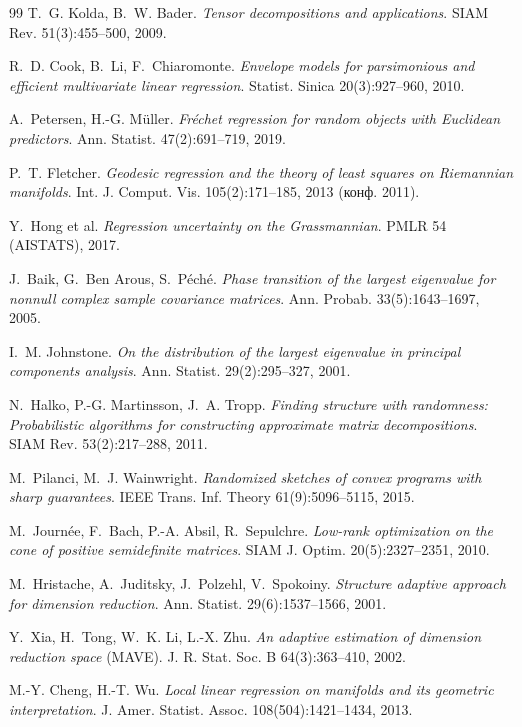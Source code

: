 \documentclass[11pt,a4paper]{article}
\theoremstyle{plain}
\theoremstyle{definition}
\theoremstyle{remark}
\begin{document}
\begin{thebibliography}{99}
T.~G. Kolda, B.~W. Bader.
\emph{Tensor decompositions and applications}.
SIAM Rev. 51(3):455--500, 2009.

R.~D. Cook, B.~Li, F.~Chiaromonte.
\emph{Envelope models for parsimonious and efficient multivariate linear
regression}. Statist. Sinica 20(3):927--960, 2010.

A.~Petersen, H.-G. M\"uller.
\emph{Fr\'echet regression for random objects with Euclidean predictors}.
Ann. Statist. 47(2):691--719, 2019.

P.~T. Fletcher.
\emph{Geodesic regression and the theory of least squares on Riemannian
manifolds}. Int. J. Comput. Vis. 105(2):171--185, 2013 (конф. 2011).

Y.~Hong et al.
\emph{Regression uncertainty on the Grassmannian}. PMLR 54 (AISTATS), 2017.

J.~Baik, G.~Ben Arous, S.~P\'ech\'e.
\emph{Phase transition of the largest eigenvalue for nonnull complex sample
covariance matrices}. Ann. Probab. 33(5):1643--1697, 2005.

I.~M. Johnstone.
\emph{On the distribution of the largest eigenvalue in principal components
analysis}. Ann. Statist. 29(2):295--327, 2001.

N.~Halko, P.-G. Martinsson, J.~A. Tropp.
\emph{Finding structure with randomness: Probabilistic algorithms for
constructing approximate matrix decompositions}.
SIAM Rev. 53(2):217--288, 2011.

M.~Pilanci, M.~J. Wainwright.
\emph{Randomized sketches of convex programs with sharp guarantees}.
IEEE Trans. Inf. Theory 61(9):5096--5115, 2015.

M.~Journ\'ee, F.~Bach, P.-A. Absil, R.~Sepulchre.
\emph{Low-rank optimization on the cone of positive semidefinite matrices}.
SIAM J. Optim. 20(5):2327--2351, 2010.

M.~Hristache, A.~Juditsky, J.~Polzehl, V.~Spokoiny.
\emph{Structure adaptive approach for dimension reduction}.
Ann. Statist. 29(6):1537--1566, 2001.

Y.~Xia, H.~Tong, W.~K. Li, L.-X. Zhu.
\emph{An adaptive estimation of dimension reduction space}
(MAVE). J. R. Stat. Soc. B 64(3):363--410, 2002.

M.-Y. Cheng, H.-T. Wu.
\emph{Local linear regression on manifolds and its geometric
interpretation}. J. Amer. Statist. Assoc. 108(504):1421--1434, 2013.

\end{thebibliography}
\end{document}
